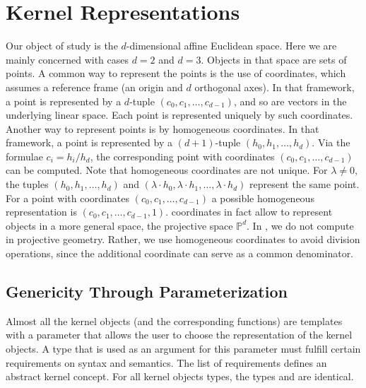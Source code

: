\section{Kernel Representations}
Our object of study is the $d$-dimensional affine Euclidean space. 
Here we are mainly concerned with cases $d=2$ and $d=3$.
Objects in that space are sets of points. A common way to represent 
the points is the use of  coordinates,
which assumes a reference frame (an origin and $d$ orthogonal axes).
In that framework, a point is represented by a $d$-tuple
$(c_0,c_1,\ldots,c_{d-1})$,
and so are vectors in the underlying linear space. Each point is 
represented uniquely by such  coordinates.
Another way to represent points is by homogeneous coordinates. In that
framework, a point is represented by a $(d+1)$-tuple
$(h_0,h_1,\ldots,h_d)$.
Via the formulae $c_i = h_i/h_d$,
the corresponding point with  coordinates
$(c_0,c_1,\ldots,c_{d-1})$
can be computed.  Note that homogeneous coordinates are not unique. 
For $\lambda\ne 0$, the tuples $(h_0,h_1,\ldots,h_d)$ and 
$(\lambda\cdot h_0,\lambda\cdot h_1,\ldots,\lambda\cdot h_d)$
represent the same point.
For a point with  coordinates $(c_0,c_1,\ldots,c_{d-1})$ a
possible homogeneous representation is $(c_0,c_1,\ldots,c_{d-1},1)$.
 coordinates in fact allow to represent 
objects in a more general space, the projective space
$\mathbb{P}^d$.
In \cgal, we do not compute in projective geometry. Rather, we use 
homogeneous coordinates to avoid division operations,
since the additional coordinate can serve as a common denominator.

\subsection{Genericity Through Parameterization}

Almost all the kernel objects (and the corresponding functions) are
templates with a parameter that allows the user to choose the
representation of the kernel objects. A type that is used as an
argument for this parameter must fulfill certain requirements on
syntax and semantics. The list of requirements defines an abstract
kernel concept. For all kernel objects types, the types
 and 
 are identical.


